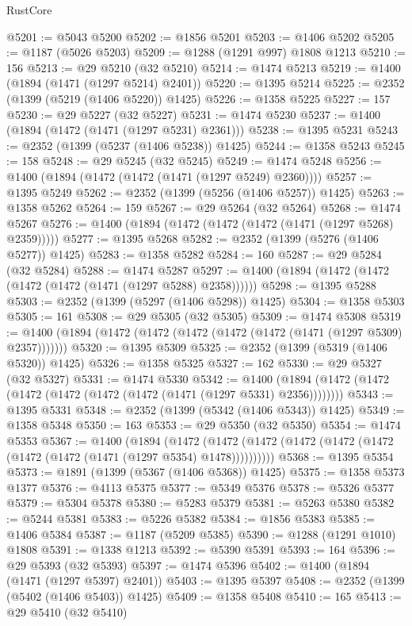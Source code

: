 \begin{lexlean}{RustCore}
\begin{coremodule}
{\begin{coremodule}
{{{{{{{{{{{{{{{{{{{{{{{{{{{{{{{{{{{{{{{{{{{{@5201 := @5043 @5200
@5202 := @1856 @5201
@5203 := @1406 @5202
@5205 := @1187 (@5026 @5203)
@5209 := @1288 (@1291 @997) @1808 @1213
@5210 := 156
@5213 := @29 @5210 (@32 @5210)
@5214 := @1474 @5213
@5219 := @1400 (@1894 (@1471 (@1297 @5214) @2401))
@5220 := @1395 @5214
@5225 := @2352 (@1399 (@5219 (@1406 @5220)) @1425)
@5226 := @1358 @5225
@5227 := 157
@5230 := @29 @5227 (@32 @5227)
@5231 := @1474 @5230
@5237 := @1400 (@1894 (@1472 (@1471 (@1297 @5231) @2361)))
@5238 := @1395 @5231
@5243 := @2352 (@1399 (@5237 (@1406 @5238)) @1425)
@5244 := @1358 @5243
@5245 := 158
@5248 := @29 @5245 (@32 @5245)
@5249 := @1474 @5248
@5256 := @1400 (@1894 (@1472 (@1472 (@1471 (@1297 @5249) @2360))))
@5257 := @1395 @5249
@5262 := @2352 (@1399 (@5256 (@1406 @5257)) @1425)
@5263 := @1358 @5262
@5264 := 159
@5267 := @29 @5264 (@32 @5264)
@5268 := @1474 @5267
@5276 := @1400 (@1894 (@1472 (@1472 (@1472 (@1471 (@1297 @5268) @2359)))))
@5277 := @1395 @5268
@5282 := @2352 (@1399 (@5276 (@1406 @5277)) @1425)
@5283 := @1358 @5282
@5284 := 160
@5287 := @29 @5284 (@32 @5284)
@5288 := @1474 @5287
@5297 := @1400 (@1894 (@1472 (@1472 (@1472 (@1472 (@1471 (@1297 @5288) @2358))))))
@5298 := @1395 @5288
@5303 := @2352 (@1399 (@5297 (@1406 @5298)) @1425)
@5304 := @1358 @5303
@5305 := 161
@5308 := @29 @5305 (@32 @5305)
@5309 := @1474 @5308
@5319 := @1400 (@1894 (@1472 (@1472 (@1472 (@1472 (@1472 (@1471 (@1297 @5309) @2357)))))))
@5320 := @1395 @5309
@5325 := @2352 (@1399 (@5319 (@1406 @5320)) @1425)
@5326 := @1358 @5325
@5327 := 162
@5330 := @29 @5327 (@32 @5327)
@5331 := @1474 @5330
@5342 := @1400 (@1894 (@1472 (@1472 (@1472 (@1472 (@1472 (@1472 (@1471 (@1297 @5331) @2356))))))))
@5343 := @1395 @5331
@5348 := @2352 (@1399 (@5342 (@1406 @5343)) @1425)
@5349 := @1358 @5348
@5350 := 163
@5353 := @29 @5350 (@32 @5350)
@5354 := @1474 @5353
@5367 := @1400
    (@1894
      (@1472 (@1472 (@1472 (@1472 (@1472 (@1472 (@1472 (@1472 (@1471 (@1297 @5354) @1478))))))))))
@5368 := @1395 @5354
@5373 := @1891 (@1399 (@5367 (@1406 @5368)) @1425)
@5375 := @1358 @5373 @1377
@5376 := @4113 @5375
@5377 := @5349 @5376
@5378 := @5326 @5377
@5379 := @5304 @5378
@5380 := @5283 @5379
@5381 := @5263 @5380
@5382 := @5244 @5381
@5383 := @5226 @5382
@5384 := @1856 @5383
@5385 := @1406 @5384
@5387 := @1187 (@5209 @5385)
@5390 := @1288 (@1291 @1010) @1808
@5391 := @1338 @1213
@5392 := @5390 @5391
@5393 := 164
@5396 := @29 @5393 (@32 @5393)
@5397 := @1474 @5396
@5402 := @1400 (@1894 (@1471 (@1297 @5397) @2401))
@5403 := @1395 @5397
@5408 := @2352 (@1399 (@5402 (@1406 @5403)) @1425)
@5409 := @1358 @5408
@5410 := 165
@5413 := @29 @5410 (@32 @5410)
}}}}}}}}}}}}}}}}}}}}}}}}}}}}}}}}}}}}}}}}}}}}
\end{coremodule}}
\end{coremodule}
\end{lexlean}
